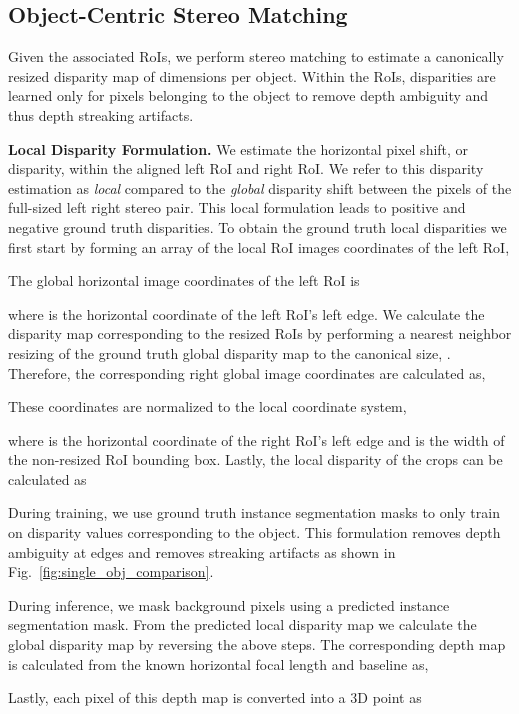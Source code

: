 \documentclass[letterpaper, 10 pt, conference]{ieeeconf}
\begin{document}
\subsection{Object-Centric Stereo Matching}

Given the associated RoIs, we perform stereo matching to estimate a canonically resized disparity map of dimensions  per object. Within the RoIs, disparities are learned only for pixels belonging to the object to remove depth ambiguity and thus depth streaking artifacts.

\textbf{Local Disparity Formulation.} We estimate the horizontal pixel shift, or disparity, within the aligned left RoI and right RoI. We refer to this disparity estimation as \textit{local} compared to the \textit{global} disparity shift between the pixels of the full-sized left right stereo pair. This local formulation leads to positive and negative ground truth disparities. To obtain the ground truth local disparities we first start by forming an array of the local RoI images coordinates  of the left RoI,

The global horizontal image coordinates  of the left RoI is 

where  is the horizontal coordinate of the left RoI's left edge. We calculate the disparity map corresponding to the resized RoIs by performing a nearest neighbor resizing of the ground truth global disparity map  to the canonical size, . Therefore, the corresponding right global image coordinates are calculated as,

These coordinates are normalized to the local coordinate system,

where  is the horizontal coordinate of the right RoI's left edge and  is the width of the non-resized RoI bounding box. Lastly, the local disparity of the crops can be calculated as

During training, we use ground truth instance segmentation masks to only train on disparity values corresponding to the object. This formulation removes depth ambiguity at edges and removes streaking artifacts as shown in Fig.~\ref{fig:single_obj_comparison}. 

During inference, we mask background pixels using a predicted instance segmentation mask. From the predicted local disparity map  we calculate the global disparity map  by reversing the above steps. The corresponding depth map  is calculated from the known horizontal focal length  and baseline  as,

Lastly, each pixel  of this depth map is converted into a 3D point as
\end{document}
